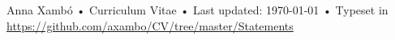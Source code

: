 \documentclass[10pt, a4paper]{article}
\begin{document}
\vfill{}

\begin{center}
{\scriptsize  Anna Xambó •\- Curriculum Vitae •\- Last updated: \today\- •\- %
Typeset in \href{http://nitens.org/taraborelli/cvtex}{
\XeTeX }\\
\href{https://github.com/axambo/CV/tree/master/Statements}{https://github.com/axambo/CV/tree/master/Statements}}
\end{center}
\end{document}
